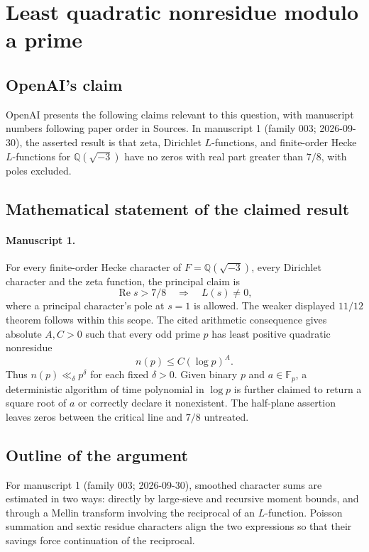 \documentclass[11pt]{article}
\begin{document}
\section*{Least quadratic nonresidue modulo a prime}

\subsection{OpenAI's claim}
OpenAI presents the following claims relevant to this question, with manuscript numbers following paper order in Sources. In manuscript 1 (family 003; 2026-09-30), the asserted result is that zeta, Dirichlet $L$-functions, and finite-order Hecke $L$-functions for $\mathbb Q(\sqrt{-3})$ have no zeros with real part greater than $7/8$, with poles excluded.

\subsection{Mathematical statement of the claimed result}
\paragraph{Manuscript 1.}
For every finite-order Hecke character of $F=\mathbb Q(\sqrt{-3})$, every Dirichlet character and the zeta function, the principal claim is
\[
 \operatorname{Re}s>7/8\quad\Longrightarrow\quad L(s)\ne0,
\]
where a principal character's pole at $s=1$ is allowed. The weaker displayed $11/12$ theorem follows within this scope. The cited arithmetic consequence gives absolute $A,C>0$ such that every odd prime $p$ has least positive quadratic nonresidue
\[
 n(p)\le C(\log p)^A.
\]
Thus $n(p)\ll_{\delta} p^{\delta}$ for each fixed $\delta>0$. Given binary $p$ and $a\in\mathbb F_p$, a deterministic algorithm of time polynomial in $\log p$ is further claimed to return a square root of $a$ or correctly declare it nonexistent. The half-plane assertion leaves zeros between the critical line and $7/8$ untreated.

\subsection{Outline of the argument}
For manuscript 1 (family 003; 2026-09-30), smoothed character sums are estimated in two ways: directly by large-sieve and recursive moment bounds, and through a Mellin transform involving the reciprocal of an $L$-function. Poisson summation and sextic residue characters align the two expressions so that their savings force continuation of the reciprocal.
\end{document}
